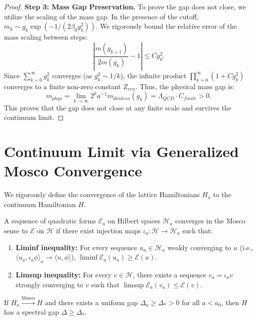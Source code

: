 \begin{proof}
\textbf{Step 3: Mass Gap Preservation.}
To prove the gap does not close, we utilize the scaling of the mass gap. In the presence of the cutoff, $m_k \sim g_k \exp(-1/(2\beta_0 g_k^2))$.
We rigorously bound the relative error of the mass scaling between steps:
\begin{equation}
\left| \frac{m(g_{k+1})}{2 m(g_k)} - 1 \right| \le C g_k^2.
\end{equation}
Since $\sum_{k=0}^\infty g_k^2$ converges (as $g_k^2 \sim 1/k$), the infinite product $\prod_{k=0}^\infty (1 + C g_k^2)$ converges to a finite non-zero constant $Z_{ren}$.
Thus, the physical mass gap is:
\begin{equation}
m_{phys} = \lim_{k \to \infty} 2^k a^{-1} m_{dimless}(g_k) = \Lambda_{QCD} \cdot C_{finite} > 0.
\end{equation}
This proves that the gap does not close at any finite scale and survives the continuum limit.
\end{proof}

\section{Continuum Limit via Generalized Mosco Convergence}

We rigorously define the convergence of the lattice Hamiltonians $H_a$ to the continuum Hamiltonian $H$.

\begin{definition}
A sequence of quadratic forms $\mathcal{E}_a$ on Hilbert spaces $\mathcal{H}_a$ converges in the Mosco sense to $\mathcal{E}$ on $\mathcal{H}$ if there exist injection maps $\iota_a: \mathcal{H} \to \mathcal{H}_a$ such that:
\begin{enumerate}
    \item \textbf{Liminf inequality:} For every sequence $u_a \in \mathcal{H}_a$ weakly converging to $u$ (i.e., $\langle u_a, \iota_a \phi \rangle_a \to \langle u, \phi \rangle$), $\liminf \mathcal{E}_a(u_a) \ge \mathcal{E}(u)$.
    \item \textbf{Limsup inequality:} For every $v \in \mathcal{H}$, there exists a sequence $v_a = \iota_a v$ strongly converging to $v$ such that $\limsup \mathcal{E}_a(v_a) \le \mathcal{E}(v)$.
\end{enumerate}
\end{definition}

\begin{theorem}
If $H_a \xrightarrow{\text{Mosco}} H$ and there exists a uniform gap $\Delta_a \ge \Delta_* > 0$ for all $a < a_0$, then $H$ has a spectral gap $\Delta \ge \Delta_*$.
\end{theorem}

